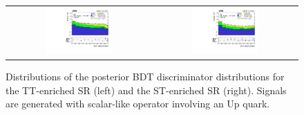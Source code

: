 \begin{figure}[tbh!]
 \begin{center}
 \begin{tabular}{cc}
  \includegraphics[width=0.48\textwidth]{figures/Part3/Results/BDT_TT_ScalarU}&
  \includegraphics[width=0.48\textwidth]{figures/Part3/Results/BDT_ST_ScalarU}\\
 \end{tabular}
 \caption{Distributions of the posterior BDT discriminator distributions for the TT-enriched SR (left) and the ST-enriched SR (right). Signals are generated with scalar-like operator involving an Up quark.}
 \label{fig:bdt_postfit_ScalarU}
 \end{center}
\end{figure} 

